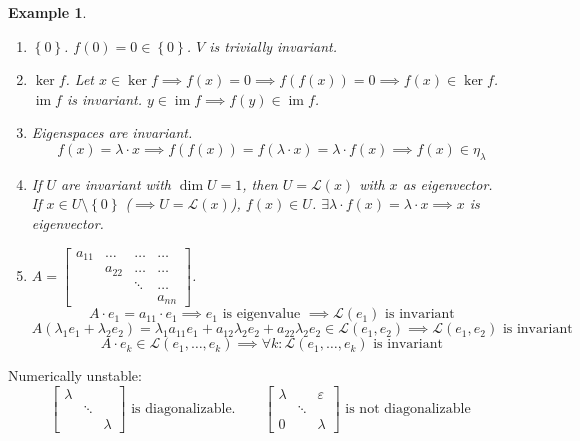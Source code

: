 \documentclass[a4paper]{article}
\newcounter{lecref}[section]
\numberwithin{lecref}{section}
\newtheorem{example}[lecref]{Example}
\newcommand{\set}[1]{\left\{#1\right\}}
\DeclareMathOperator{\im}{im}
\begin{document}
\begin{example} %
  \begin{enumerate}
    \item $\set{0}$. $f(0) = 0 \in \set{0}$. $V$ is trivially invariant.
    \item $\ker{f}$. Let $x \in \ker{f} \implies f(x) = 0 \implies f(f(x)) = 0 \implies f(x) \in \ker{f}$. \\
      $\im{f}$ is invariant. $y \in \im{f} \implies f(y) \in \im{f}$.
    \item Eigenspaces are invariant.
      \[ f(x) = \lambda \cdot x \implies f(f(x)) = f(\lambda \cdot x) = \lambda \cdot f(x) \implies f(x) \in \eta_{\lambda} \]
    \item If $U$ are invariant with $\dim{U} = 1$, then $U = \mathcal L(x)$ with $x$ as eigenvector. \\
      If $x \in U \setminus \set{0}$ ($\implies U = \mathcal L(x)$), $f(x) \in U$. $\exists \lambda \cdot f(x) = \lambda \cdot x \implies x$ is eigenvector.
    \item $A = \begin{bmatrix} a_{11} & \dots & \dots & \dots \\ & a_{22} & \dots & \dots \\ & & \ddots & \dots \\ & & & a_{nn} \end{bmatrix}$.
      \[ A \cdot e_1 = a_{11} \cdot e_1 \implies e_1 \text{ is eigenvalue } \implies \mathcal L(e_1) \text{ is invariant} \]
      \[ A(\lambda_1 e_1 + \lambda_2 e_2) = \lambda_1 a_{11} e_1 + a_{12} \lambda_2 e_2 + a_{22} \lambda_2 e_2 \in \mathcal L(e_1, e_2) \implies \mathcal L(e_1, e_2) \text{ is invariant} \]
      \[ A \cdot e_k \in \mathcal L(e_1, \dots, e_k) \implies \forall k: \mathcal L(e_1, \dots, e_k) \text{ is invariant} \]
  \end{enumerate}
\end{example}

Numerically unstable:
\[
  \begin{bmatrix} \lambda & & \\ & \ddots & \\ & & \lambda \end{bmatrix}
  \text{ is diagonalizable.}
\qquad
  \begin{bmatrix} \lambda & & \varepsilon \\ & \ddots & \\ 0 & & \lambda \end{bmatrix}
  \text{ is not diagonalizable}
\]
\end{document}
